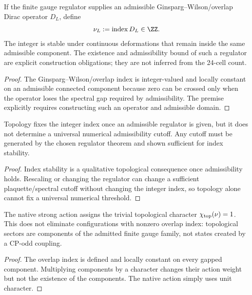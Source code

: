 \documentclass[12pt,a4paper]{article}
\begin{document}
\begin{theorem}
\label{p10:thm:admissible-finite-topology-index}
If the finite gauge regulator supplies an admissible Ginsparg--Wilson/overlap Dirac operator \(D_L\), define
\begin{equation}
\nu_L:=\operatorname{index}D_L\in\ZZ.
\end{equation}
The integer is stable under continuous deformations that remain inside the same admissible component.  The existence and admissibility bound of such a regulator are explicit construction obligations; they are not inferred from the 24-cell count.
\end{theorem}
\begin{proof}
The Ginsparg--Wilson/overlap index is integer-valued and locally constant on an admissible connected component because zero can be crossed only when the operator loses the spectral gap required by admissibility.  The premise explicitly requires constructing such an operator and admissible domain.
\end{proof}

\begin{corollary}
\label{p10:cor:no-free-admissibility-constant}
Topology fixes the integer index once an admissible regulator is given, but it does not determine a universal numerical admissibility cutoff.  Any cutoff must be generated by the chosen regulator theorem and shown sufficient for index stability.
\end{corollary}
\begin{proof}
Index stability is a qualitative topological consequence once admissibility holds.  Rescaling or changing the regulator can change a sufficient plaquette/spectral cutoff without changing the integer index, so topology alone cannot fix a universal numerical threshold.
\end{proof}

\begin{theorem}
\label{p10:thm:topological-sectors-survive}
The native strong action assigns the trivial topological character
\(\chi_{\rm top}(\nu)=1\).  This does not eliminate configurations with
nonzero overlap index: topological sectors are components of the admitted
finite gauge family, not states created by a CP-odd coupling.
\end{theorem}
\begin{proof}
The overlap index is defined and locally constant on every gapped component.
Multiplying components by a character changes their action weight but not the
existence of the components.  The native action simply uses unit character.
\end{proof}
\end{document}
